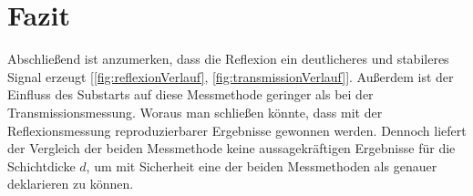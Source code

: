 \chapter{Fazit}
\label{chap:fazit}

Abschließend ist anzumerken, dass die Reflexion ein deutlicheres und stabileres Signal erzeugt [\ref{fig:reflexionVerlauf}, \ref{fig:transmissionVerlauf}]. Außerdem ist der Einfluss des Substarts auf diese Messmethode geringer als bei der Transmissionsmessung. Woraus man schließen könnte, dass mit der Reflexionsmessung reproduzierbarer Ergebnisse gewonnen werden. Dennoch liefert der Vergleich der beiden Messmethode keine aussagekräftigen Ergebnisse für die Schichtdicke $d$, um mit Sicherheit eine der beiden Messmethoden als genauer deklarieren zu können.

